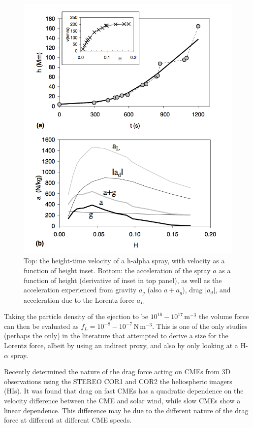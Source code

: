\begin{figure}[ts!]
\begin{center}
\includegraphics[scale=0.4, trim=0cm 0cm 0cm 2cm]{images/vrsnak_lorentz}
\caption[Acceleration due to all forces acting on CME]{Top: the height-time velocity of a h-alpha spray, with velocity as a function of height inset. Bottom: the acceleration of the spray $a$ as a function of height (derivative of inset in top panel), as well as the acceleration experienced from gravity $a_g$ (also $a+a_g$), drag $|a_d|$, and acceleration due to the Lorentz force $a_L$ \citep{vrs06}}
\label{fig:vrsnak06}
\end{center}
\end{figure}
Taking the particle density of the ejection to be $10^{16}-10^{17}$\,m$^{-3}$ the volume force can then be evaluated as $f_L = 10^{-8}-10^{-7}$\,N\,m$^{-3}$. This is one of the only studies (perhaps the only) in the literature that attempted to derive a size for the Lorentz force, albeit by using an indirect proxy, and also by only looking at a H-$\alpha$ spray. 

Recently \citet{malo10} determined the nature of the drag force acting on CMEs from 3D observations using the STEREO COR1 and COR2 the heliospheric imagers (HIs). It was found that drag on fast CMEs has a quadratic dependence on the velocity difference between the CME and solar wind, while slow CMEs show a linear dependence. This difference may be due to the different nature of the drag force at different at different CME speeds.


